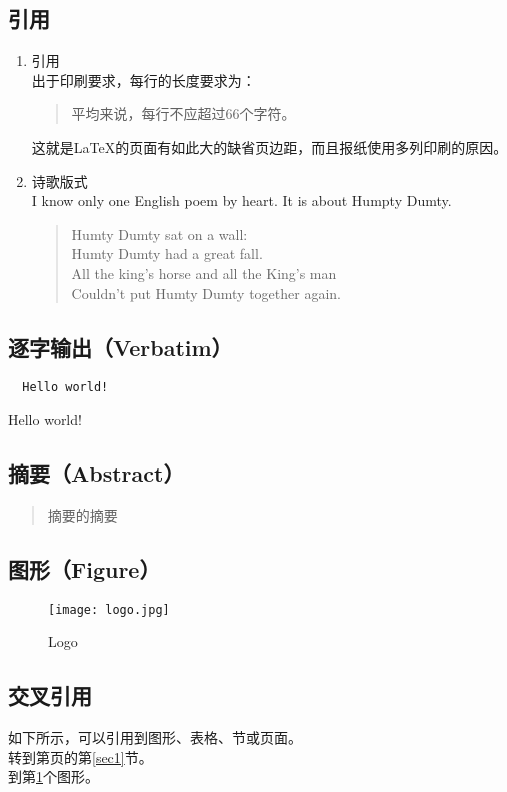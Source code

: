 \documentclass[12pt]{article}
\begin{document}
\subsection{引用}
\begin{enumerate}
	\item 引用\\
	出于印刷要求，每行的长度要求为：
	\begin{quote}
		平均来说，每行不应超过66个字符。
	\end{quote}
	这就是\LaTeX{}的页面有如此大的缺省页边距，而且报纸使用多列印刷的原因。
	\item 诗歌版式\\
	I know only one English poem by heart. It is about Humpty Dumty.
	\begin{flushleft}
		\begin{verse}
			Humty Dumty sat on a wall:\\
			Humty Dumty had a great fall.\\
			All the king's horse and all the King's man\\
			Couldn't put Humty Dumty together again.
		\end{verse}
	\end{flushleft}
\end{enumerate}
\subsection{逐字输出（Verbatim）}
\begin{verbatim}
  Hello world!
\end{verbatim}
Hello world!
\subsection{摘要（Abstract）}
\begin{abstract}
	摘要的摘要\label{abs}
\end{abstract}
\subsection{图形（Figure）}
\begin{figure}[!htp]
	\centering
	\texttt{[image: logo.jpg]}
	\caption{Logo}\label{logo}
\end{figure} %
\subsection{交叉引用}
如下所示，可以引用到图形、表格、节或页面。\\
转到第\pageref{sec1}页的第\ref{sec1}节。\\
到第\ref{logo}个图形。
\end{document}
